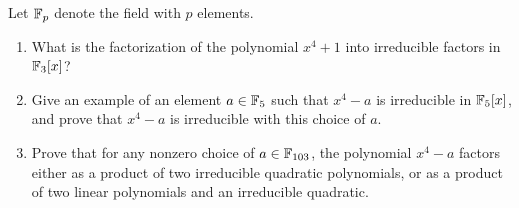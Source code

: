\begin{question}[subtitle = January 2021 Problem 5,ID=Jan21_5]
Let $\mathbb{F}_p$ denote the field with $p$ elements.
\begin{enumerate}
    \item What is the factorization of the polynomial $x^4+1$ into irreducible factors in $\mathbb{F}_3[x]$?
    \item Give an example of an element $a \in \mathbb{F}_5$ such that $x^4-a$ is irreducible in $\mathbb{F}_5[x]$, and prove that $x^4-a$ is irreducible with this choice of $a$.
    \item Prove that for any nonzero choice of $a \in \mathbb{F}_{103}$, the polynomial $x^4-a$ factors either as a product of two irreducible quadratic polynomials, or as a product of two linear polynomials and an irreducible quadratic.
\end{enumerate}
\end{question}
